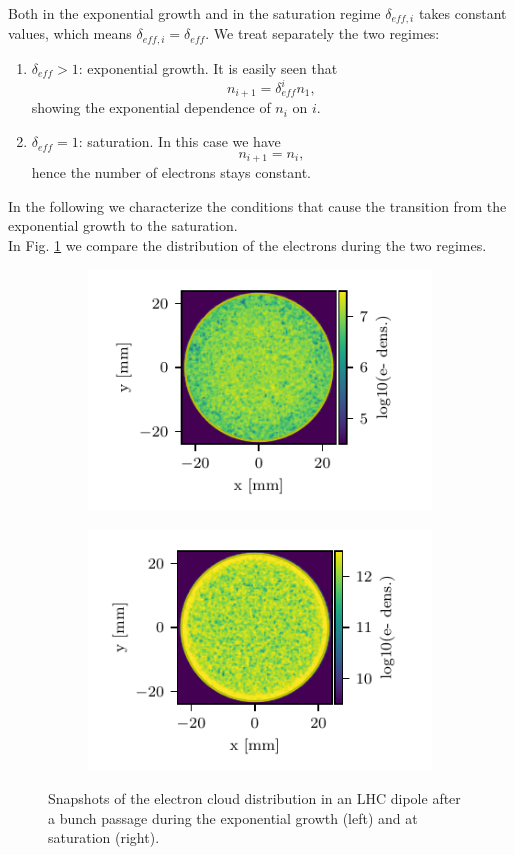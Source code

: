 Both in the exponential growth and in the saturation regime $\delta_{eff, i}$ takes constant values, which means $\delta_{eff, i} = \delta_{eff}$.
We treat separately the two regimes:
\begin{enumerate}
    \item $\delta_{eff}>1$: exponential growth. It is easily seen that $$n_{i+1} = \delta_{eff}^i n_1,$$
    showing the exponential dependence of $n_i$ on $i$.
    \item $\delta_{eff} = 1$: saturation. In this case we have $$n_{i+1} = n_{i},$$ hence the number of electrons stays constant.
\end{enumerate}
In the following we characterize the conditions that cause the transition from the exponential growth to the saturation.\\
In Fig. \ref{fig:exp_vs_sat_snap} we compare the distribution of the electrons during the two regimes.
\begin{figure}
    \centering
    \begin{subfigure}{0.47\textwidth}
        \hspace*{-2cm}
        \includegraphics[scale=1.4]{chapters/Chapter1/Figures/edist_exp.pdf}
    \end{subfigure}
    \begin{subfigure}{0.47\textwidth}
    
        \includegraphics[scale=1.4]{chapters/Chapter1/Figures/edist_sat.pdf}
    \end{subfigure}
    \caption{Snapshots of the electron cloud distribution in an LHC dipole after a bunch passage during the exponential growth (left) and at saturation (right).}
    \label{fig:exp_vs_sat_snap}
\end{figure}
